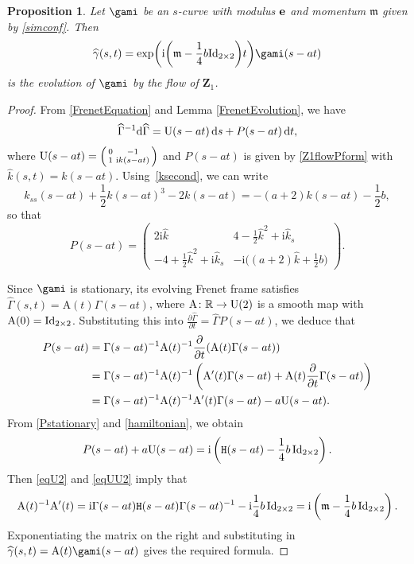 \documentclass[pdftex]{sigma}
\newcommand\kk{k} %
\def\ri{\mathrm{i}}
\newcommand\VZ{\mathbf Z}
\newcommand{\ds}{\,{\rm d}s}
\def\gam{\gamma} %
\def\di{\partial}
\def\R{\mathbb R}
\newcommand\be{{\bf e}}
\newcommand\gamf{\widehat{\gam}} %
\newcommand\Gamf{\widehat{\Gamma}} %
\newcommand\kh{\widehat{\kk}} %
\newcommand\rA{\mathrm{A}}
\numberwithin{equation}{section}
\newtheorem{Proposition}[Theorem]{Proposition}
 { \theoremstyle{definition}
\newtheorem{Definition}[Theorem]{Definition}
\newtheorem{Note}[Theorem]{Note}
\newtheorem{Example}[Theorem]{Example}
\newtheorem{Remark}[Theorem]{Remark} }
\begin{document}
\begin{Proposition} \label{timeevolution}Let $\gami$ be an $s$-curve with modulus $\be$ and momentum ${\mathfrak m}$ given by \eqref{simconf}.
Then
\begin{equation*}%
\gamf(s,t)= \exp \biggl(\ri \biggl({\mathfrak m}-\frac14 b{\rm Id}_{2\times 2}\biggr)t\biggr) \gami(s-at)
\end{equation*}
is the evolution of $\gami$ by the flow of $\VZ_1$. \end{Proposition}

\begin{proof} From \eqref{FrenetEquation} and Lemma \ref{FrenetEvolution}, we have
\[\Gamf^{-1}  {\rm d}\Gamf = {\rm U}(s-at)\ds + P(s-at)\, {\rm d}t,\]
where ${\rm U}(s-at) = \left( \begin{smallmatrix} 0 & -1 \\ 1 & \ri k(s-at) \end{smallmatrix} \right)$ and $
P(s-at)$ is given by \eqref{Z1flowPform} with $\kh(s,t) = k(s-at)$.
Using~\eqref{ksecond}, we can write
\[\kk_{ss}(s-at)+\frac12 \kk(s-at)^3-2\kk(s-at)=-(a+2)\kk(s-at)-\frac12 b,\]
so that
\begin{equation}\label{Pstationary}
P(s-a t) =
\begin{pmatrix} 2\ri \kh & 4-\tfrac12 \kh^2 +\ri \kh_s \\
-4+\tfrac12 \kh^2 + \ri \kh_s & -\ri\bigl((a+2)\kh+\tfrac12{b}\bigr) \end{pmatrix}.
\end{equation}

Since $\gami$ is stationary, its evolving Frenet frame satisfies $\Gamf(s,t)=\rA(t) \Gamma(s-at)$, where
${\rA\colon\R\to {\rm U}(2)}$ is a smooth map with $\rA(0)={\rm Id}_{2\times 2}$.
Substituting this into $\frac{\partial \Gamf}{\partial t} = \Gamf P(s-at)$, we deduce that
\begin{align}
P(s-at)={}& \Gamma(s-at)^{-1} \rA(t)^{-1}\frac{\di}{\di t} (\rA(t) \Gamma(s-at))\nonumber\\
={}&\Gamma(s-at)^{-1} \rA(t)^{-1}\left(\rA'(t)  \Gamma(s-at)+\rA(t) \frac{\di}{\di t} \Gamma(s-at)\right)\nonumber\\
={}&\Gamma(s-at)^{-1} \rA(t)^{-1} \rA'(t) \Gamma(s-at) -a {\rm U}(s-at).\label{eqU2}
\end{align}
From \eqref{Pstationary} and \eqref{hamiltonian}, we obtain
\begin{equation}\label{eqUU2} P(s-at)+a {\rm U}(s-at)=\ri \left({\mathtt H}(s-at)-\frac14 b\,{\rm Id}_{2\times 2}\right).\end{equation}
Then \eqref{eqU2} and \eqref{eqUU2} imply that
\[ \rA(t)^{-1} \rA'(t) =\ri \Gamma(s-at) {\mathtt H}(s-at) \Gamma(s-a t)^{-1}
-\ri \frac14 b\,{\rm Id}_{2\times 2}= \ri \left({\mathfrak m}-\frac14{b}\,{\rm Id}_{2\times 2}\right).\]
Exponentiating the matrix on the right and substituting in $\gamf(s,t) = \rA(t) \gami(s-a t)$ gives the required formula.
\end{proof}
\end{document}
